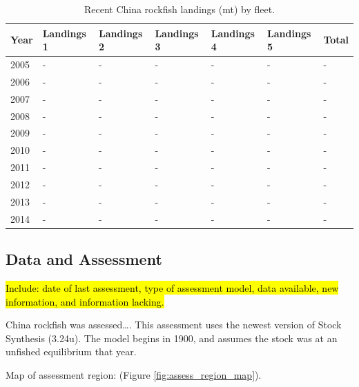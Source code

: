 \documentclass[12pt,]{article}
\begin{document}
\begin{table}[ht]
\centering
\caption{Recent China rockfish landings (mt) by 
                                            fleet.} 
\label{tab:Exec_catch}
\begin{tabular}{l>{\centering}p{1in}>{\centering}p{1in}>{\centering}p{1in}>{\centering}p{.9in}>{\centering}p{.9in}>{\centering}p{.6in}}
  \hline
Year & Landings 1 & Landings 2 & Landings 3 & Landings 4 & Landings 5 & Total \\ 
  \hline
2005 & - & - & - & - & - & - \\ 
  2006 & - & - & - & - & - & - \\ 
  2007 & - & - & - & - & - & - \\ 
  2008 & - & - & - & - & - & - \\ 
  2009 & - & - & - & - & - & - \\ 
  2010 & - & - & - & - & - & - \\ 
  2011 & - & - & - & - & - & - \\ 
  2012 & - & - & - & - & - & - \\ 
  2013 & - & - & - & - & - & - \\ 
  2014 & - & - & - & - & - & - \\ 
   \hline
\end{tabular}
\end{table}

\FloatBarrier

\newpage

\subsection*{Data and Assessment}\label{data-and-assessment}

\hl{Include: date of last assessment, type of assessment model, data available, new 
information, and information lacking.}

China rockfish was assessed\ldots{}. This assessment uses the newest
version of Stock Synthesis (3.24u). The model begins in 1900, and
assumes the stock was at an unfished equilibrium that year.

Map of assessment region: (Figure \ref{fig:assess_region_map}).
\end{document}
